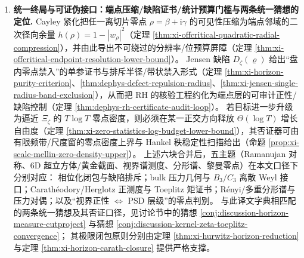 \begin{enumerate}
  \item \textbf{统一终局与可证伪接口：端点压缩/缺陷证书/统计预算门槛与两条统一猜想的定位.}
  Cayley 紧化把任一离切片零点 \(\rho=\beta+\mathrm{i}\gamma\) 的可见性压缩为端点邻域的二次径向余量
  \(h(\rho)=1-|w_\rho|^2\)（定理 \ref{thm:xi-offcritical-quadratic-radial-compression}），并由此导出不可绕过的分辨率/位预算屏障（定理 \ref{thm:xi-offcritical-endpoint-resolution-lower-bound}）。
  Jensen 缺陷 \(D_{\zeta}(\varrho)\) 给出“盘内零点禁入”的单参证书与排斥半径/带状禁入形式（定理 \ref{thm:xi-horizon-purity-criterion}、\ref{thm:dephys-defect-repulsion-radius}、\ref{thm:xi-jensen-single-radius-band-exclusion}），从而把 RH 的核验工程约化为端点层的可审计正性/缺陷控制（定理 \ref{thm:dephys-rh-certificate-audit-loop}）。
  若目标进一步升级为逼近 \(\Xi_\zeta\) 的 \(T\log T\) 零点密度，则必须在某一正交方向释放 \(\Theta(\log T)\) 增长自由度（定理 \ref{thm:xi-zero-statistics-log-budget-lower-bound}），其否证器可由有限频带/尺度窗的零点密度上界与 Hankel 秩稳定性扫描给出（命题 \ref{prop:xi-scale-mellin-zero-density-upper}）。
  上述六块合并后，五主题（Ramanujan 对称、\(6\)D 超立方体/黄金截面、视界谱测度、分形谱、黎曼零点）在本文口径下分别对应：
  相位化闭包与缺陷排斥；bulk 压力几何与 \(B_3/C_3\) 离散 Weyl 接口；Carath\'eodory/Herglotz 正测度与 Toeplitz 矩证书；Rényi/多重分形谱与压力对偶；以及“视界正性 \(\Leftrightarrow\) PSD 层级”的零点判别。
  与此译文字典相匹配的两条统一猜想及其否证口径，见讨论节中的猜想 \ref{conj:discussion-horizon-measure-cutproject} 与猜想 \ref{conj:discussion-kernel-zeta-toeplitz-convergence}；
  其极限闭包原则分别由定理 \ref{thm:xi-hurwitz-horizon-reduction} 与定理 \ref{thm:xi-horizon-carath-closure} 提供严格支撑。
\end{enumerate}


